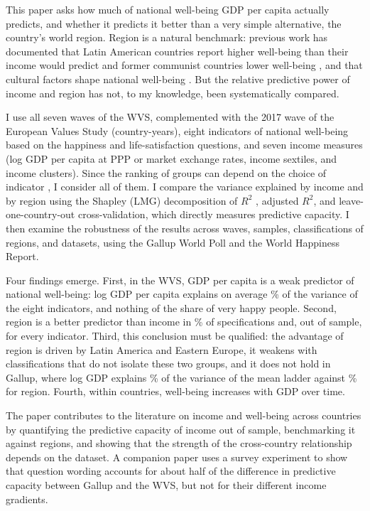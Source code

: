 \documentclass[12pt]{article}
\begin{document}
This paper asks how much of national well-being GDP per capita actually predicts, and whether it predicts it better than a very simple alternative, the country's world region. Region is a natural benchmark: previous work has documented that Latin American countries report higher well-being than their income would predict \citep{graham_paradox_2009,rojas_handbook_2016,inglehart_development_2008} and former communist countries lower well-being \citep{guriev_unhappiness_2009}, and that cultural factors shape national well-being \citep{diener_culture_2000,diener_personality_2003,exton_comparing_2015,senik_french_2014}. But the relative predictive power of income and region has not, to my knowledge, been systematically compared.

I use all seven waves of the WVS, complemented with the 2017 wave of the European Values Study (\nWVSCountryYears country-years), eight indicators of national well-being based on the happiness and life-satisfaction questions, and seven income measures (log GDP per capita at PPP or market exchange rates, income sextiles, and income clusters). Since the ranking of groups can depend on the choice of indicator \citep{bond_sad_2019}, I consider all of them. I compare the variance explained by income and by region using the Shapley (LMG) decomposition of $R^2$ \citep{lindeman_introduction_1980,gromping_estimators_2007}, adjusted $R^2$, and leave-one-country-out cross-validation, which directly measures predictive capacity. I then examine the robustness of the results across waves, samples, classifications of regions, and datasets, using the Gallup World Poll and the World Happiness Report.

Four findings emerge. First, in the WVS, GDP per capita is a weak predictor of national well-being: log GDP per capita explains on average \meanRtwoIncomePPP\% of the variance of the eight indicators, and nothing of the share of very happy people. Second, region is a better predictor than income in \shareRegionBetterWVS\% of specifications and, out of sample, for every indicator. Third, this conclusion must be qualified: the advantage of region is driven by Latin America and Eastern Europe, it weakens with classifications that do not isolate these two groups, and it does not hold in Gallup, where log GDP explains \RtwoGallupMeanPPP\% of the variance of the mean ladder against \RtwoGallupRegion\% for region. Fourth, within countries, well-being increases with GDP over time.

The paper contributes to the literature on income and well-being across countries \citep{easterlin_does_1974,easterlin_happiness_2010,stevenson_economic_2008,deaton_income_2008,jebb_happiness_2018} by quantifying the predictive capacity of income out of sample, benchmarking it against regions, and showing that the strength of the cross-country relationship depends on the dataset. A companion paper  uses a survey experiment to show that question wording accounts for about half of the difference in predictive capacity between Gallup and the WVS, but not for their different income gradients.
\end{document}
